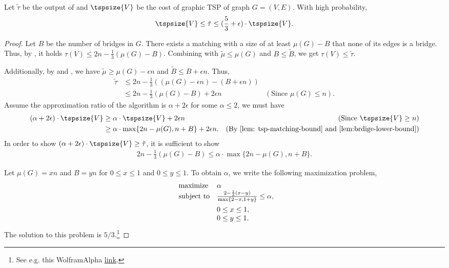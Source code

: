 \begin{lemma}\label{lem: graphic-tsp-approx3}
Let $\tilde{\tau}$ be the output of  and $\tspsize{V}$ be the cost of graphic TSP of graph $G = (V, E)$. With high probability,
$$
\tspsize{V} \leq \tilde{\tau} \leq (\frac{5}{3} + \epsilon) \cdot \tspsize{V}.
$$
\end{lemma}
\begin{proof}
    Let $B$ be the number of bridges in $G$. There exists a matching with a size of at least $\mu(G) - B$ that none of its edges is a bridge. Thus, by , it holds $\tau(V) \leq 2n - \frac{1}{3}(\mu(G) - B)$. Combining with $\tilde\mu \leq \mu(G)$ and $B \leq \tilde B$, we get $\tau(V) \leq \tilde\tau$.

    Additionally, by  and , we have $\tilde \mu \geq \mu(G) - \epsilon n$ and $\tilde B \leq B + \epsilon n$. Thus,
    \begin{align*}
    \tilde{\tau} & \leq 2n - \frac{1}{3}\left( (\mu(G) - \epsilon n) - (B + \epsilon n) \right) \\
    & \leq 2n - \frac{1}{3}(\mu(G) - B) + 2\epsilon n & (\text{Since } \mu(G) \leq n).
    \end{align*}
    Assume the approximation ratio of the algorithm is $\alpha + 2\epsilon$ for some $\alpha \leq 2$, we must have
    \begin{align*}
    (\alpha + 2\epsilon) \cdot \tspsize{V} & \geq \alpha \cdot \tspsize{V} + 2\epsilon n & (\text{Since } \tspsize{V} \geq n) \\ 
    & \geq \alpha\cdot \max\{2n - \mu(G), n + B\} + 2\epsilon n. & (\text{By \Cref{lem: tsp-matching-bound}  and  \Cref{lem:brdige-lower-bound}})
\end{align*}
In order to show $(\alpha + 2\epsilon)\cdot\tspsize{V} \geq \tilde{\tau}$, it is sufficient to show 
\begin{align*}
    2n - \frac{1}{3}(\mu(G) - B) \leq \alpha\cdot \max\{2n - \mu(G), n + B\}.
\end{align*}

Let $\mu(G) = xn$ and $B = yn$ for $0 \leq x \leq 1$ and $ 0\leq y \leq 1$. To obtain $\alpha$, we write the following maximization problem,
\begin{align*}
\begin{array}{ll@{}ll}
\text{maximize}  & \alpha \\
\vspace{5px}\text{subject to}& \frac{2 - \frac{1}{3}(x - y)}{\max\{2-x, 1+y\}} \leq \alpha,\\
                & 0\leq x \leq 1,\\
                 & 0\leq y \leq 1.
\end{array}
\end{align*}
The solution to this problem is $5/3$.\footnote{See e.g. this WolframAlpha  \href{https://www.wolframalpha.com/input?i=Maximize\%5B\%282-1\%2F3*\%28x+-+y\%29\%29+\%2F+Max\%5B2-x\%2C+1\%2By\%5D\%2C+\%7B0\%3C\%3D+x+\%3C\%3D1\%2C+0\%3C\%3Dy\%3C\%3D1\%7D\%2C+\%7Bx\%2Cy\%7D\%5D}{link}.}
\end{proof}

